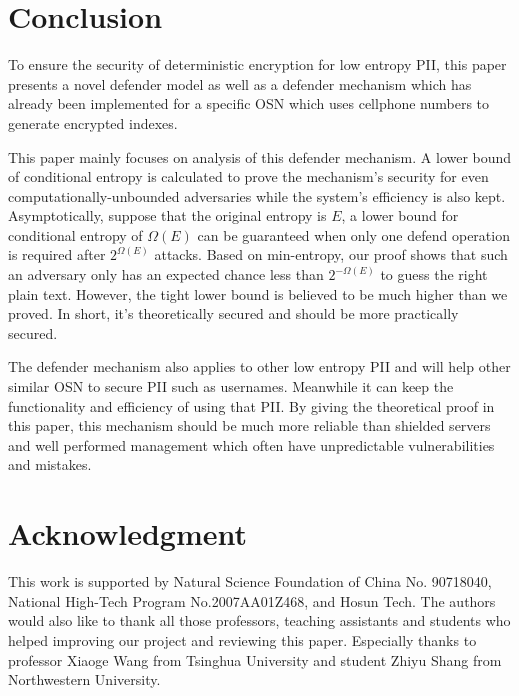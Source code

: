 \documentclass[10pt, conference, compsocconf]{IEEEtran}
\begin{document}
\section{Conclusion}\label{sec_cl}
    To ensure the security of deterministic encryption
    for low entropy PII,
    this paper presents a novel defender model as well
    as a defender mechanism which has already been implemented
    for a specific
    OSN which uses cellphone numbers to generate encrypted indexes.

    This paper mainly focuses on analysis of this defender mechanism.
    A lower bound of conditional entropy is calculated to
    prove the mechanism's security for even
    computationally-unbounded adversaries while
    the system's efficiency is also kept.
    Asymptotically, suppose that the original entropy is $E$,
    a lower bound for conditional entropy of $\Omega(E)$ can be
    guaranteed when only one defend operation is required after
    $2^{\Omega(E)}$ attacks.
    Based on min-entropy, our proof shows that
    such an adversary only has an expected chance
    less than $2^{-\Omega(E)}$ to guess the right plain text.
    However, the tight lower bound
    is believed to be much higher than we proved.
    In short, it's theoretically secured and should be more practically secured.

    The defender mechanism also applies to other low entropy
    PII and will help other similar OSN to secure PII such
    as usernames. Meanwhile it can keep the functionality and efficiency
    of using that PII. By giving the theoretical proof
    in this paper, this mechanism should be much more reliable than
    shielded servers and well performed management which often have unpredictable
    vulnerabilities and mistakes.



\section*{Acknowledgment}
This work is supported by Natural Science Foundation of China No. 90718040, National High-Tech Program No.2007AA01Z468,
and Hosun Tech.
The authors would also like to thank all those professors, teaching assistants and students
who helped improving our project and reviewing this paper. Especially thanks to professor
Xiaoge Wang from Tsinghua University and student Zhiyu Shang from Northwestern University.
\end{document}
